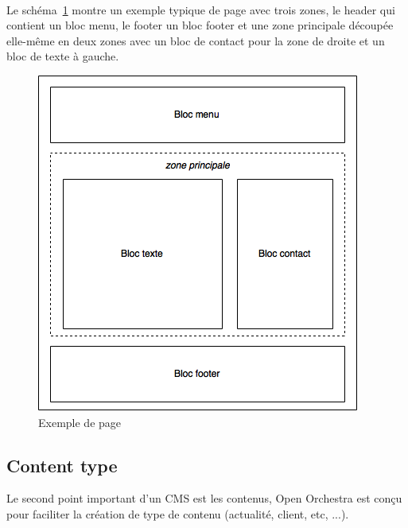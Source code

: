          \paragraph{}
		Le schéma~\ref{node} montre un exemple typique de page avec trois zones, le header qui contient un bloc menu, le footer un bloc footer et une zone principale découpée elle-même en deux zones avec un bloc de contact pour la zone de droite et un bloc de texte à gauche.
		\begin{figure}[H]
        \begin{center}
          \includegraphics[scale=0.75]{images/node}
        \end{center}
        \caption{Exemple de page}
        \label{node}
      \end{figure}
         \subsection{Content type}
         Le second point important d'un CMS est les contenus, Open Orchestra est conçu pour faciliter la création de type de contenu (actualité, client, etc, ...).
